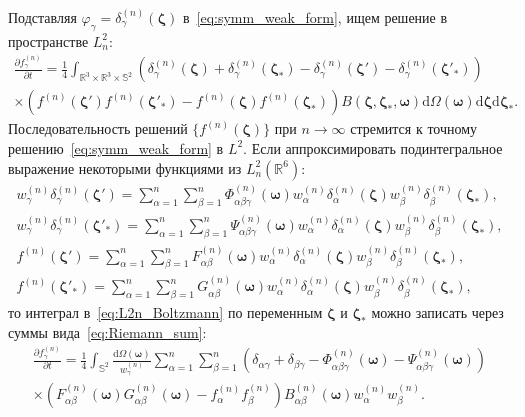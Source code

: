\documentclass{article}
\newcommand{\dd}{\mathrm{d}}
\newcommand{\pder}[2][]{\frac{\partial#1}{\partial#2}}
\newcommand{\dzeta}{\boldsymbol{\dd\zeta}}
\newcommand{\bzeta}{\boldsymbol{\zeta}}
\newcommand{\bomega}{\boldsymbol{\omega}}
\begin{document}
Подставляя \(\varphi_\gamma = \delta^{(n)}_\gamma(\bzeta)\) в~\eqref{eq:symm_weak_form}, ищем решение в пространстве \(L^2_n\):
\begin{multline}\label{eq:L2n_Boltzmann}
    \pder[f^{(n)}_\gamma]{t} =
        \frac14\int_{\mathbb{R}^3\times\mathbb{R}^3\times\mathbb{S}^2}
        \left(\delta^{(n)}_\gamma(\bzeta)+\delta^{(n)}_\gamma(\bzeta_*)-\delta^{(n)}_\gamma(\bzeta')-\delta^{(n)}_\gamma(\bzeta'_*)\right) \\
        \times\left(f^{(n)}(\bzeta')f^{(n)}(\bzeta'_*)-f^{(n)}(\bzeta)f^{(n)}(\bzeta_*)\right) B(\bzeta,\bzeta_*,\bomega)
        \dd\Omega(\bomega)\dzeta\dzeta_*.
\end{multline}
Последовательность решений \(\{f^{(n)}(\bzeta)\}\) при \(n\to\infty\) стремится к точному решению~\eqref{eq:symm_weak_form} в \(L^2\).
Если аппроксимировать подинтегральное выражение некоторыми функциями из \(L^2_n(\mathbb{R}^6)\):
\begin{gather}
    w^{(n)}_\gamma \delta^{(n)}_\gamma(\bzeta') = \sum_{\alpha=1}^n \sum_{\beta=1}^n
        \Phi^{(n)}_{\alpha\beta\gamma}(\bomega) w^{(n)}_\alpha \delta^{(n)}_\alpha(\bzeta)
        w^{(n)}_\beta \delta^{(n)}_\beta(\bzeta_*), \label{eq:Phi_abc}\\
    w^{(n)}_\gamma \delta^{(n)}_\gamma(\bzeta'_*) = \sum_{\alpha=1}^n \sum_{\beta=1}^n
        \Psi^{(n)}_{\alpha\beta\gamma}(\bomega) w^{(n)}_\alpha \delta^{(n)}_\alpha(\bzeta)
        w^{(n)}_\beta \delta^{(n)}_\beta(\bzeta_*), \label{eq:Psi_abc}\\
    f^{(n)}(\bzeta') = \sum_{\alpha=1}^n \sum_{\beta=1}^n
        F^{(n)}_{\alpha\beta}(\bomega) w^{(n)}_\alpha \delta^{(n)}_\alpha(\bzeta)
        w^{(n)}_\beta \delta^{(n)}_\beta(\bzeta_*), \label{eq:F_ab}\\
    f^{(n)}(\bzeta'_*) = \sum_{\alpha=1}^n \sum_{\beta=1}^n
        G^{(n)}_{\alpha\beta}(\bomega) w^{(n)}_\alpha \delta^{(n)}_\alpha(\bzeta)
        w^{(n)}_\beta \delta^{(n)}_\beta(\bzeta_*), \label{eq:G_ab}
\end{gather}
то интеграл в~\eqref{eq:L2n_Boltzmann} по переменным \(\bzeta\) и \(\bzeta_*\)
можно записать через суммы вида~\eqref{eq:Riemann_sum}:
\begin{multline}\label{eq:L2n_Boltzmann_sum}
    \pder[f^{(n)}_\gamma]{t} =
        \frac14\int_{\mathbb{S}^2}\frac{\dd\Omega(\bomega)}{w^{(n)}_\gamma} \sum_{\alpha=1}^n \sum_{\beta=1}^n
        \left(\delta_{\alpha\gamma} + \delta_{\beta\gamma}
            - \Phi^{(n)}_{\alpha\beta\gamma}(\bomega) - \Psi^{(n)}_{\alpha\beta\gamma}(\bomega)\right) \\
        \times\left(F^{(n)}_{\alpha\beta}(\bomega)G^{(n)}_{\alpha\beta}(\bomega) - f^{(n)}_\alpha f^{(n)}_\beta\right)
        B^{(n)}_{\alpha\beta}(\bomega) w^{(n)}_\alpha w^{(n)}_\beta.
\end{multline}
\end{document}
